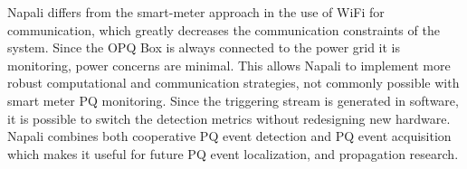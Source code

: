 Napali differs from the smart-meter approach in the use of WiFi for communication, which greatly decreases the communication constraints of the system.
Since the OPQ Box is always connected to the power grid it is monitoring, power concerns are minimal.
This allows Napali to implement more robust computational and communication strategies, not commonly possible with smart meter PQ monitoring.
Since the triggering stream is generated in software, it is possible to switch the detection metrics without redesigning new hardware.
Napali combines both cooperative PQ event detection and PQ event acquisition which makes it useful for future PQ event localization, and propagation research.\cite{parsons1998direction} \cite{polajvzer2017evaluation}
